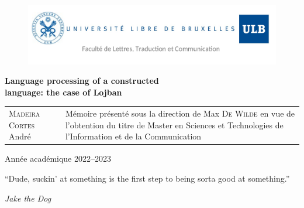 

\usepackage[
    backend=bibtex, style=authortitle, defernumbers=true,
]{biblatex}





\begin{titlingpage}

\begin{figure}[H]
\vspace{-2cm}
\hspace{-2.5cm}
\includegraphics[scale=0.30]{images/header.png}
\end{figure}

\vfill

\begin{center}
\hspace{-0.5cm}
\Huge{\textbf{Language processing of a constructed \\language: the case of Lojban}}\\
\end{center}

\vfill

\begin{tabular}{b{6.5cm}b{7.5cm}}
\textsc{Madeira Cortes} André & Mémoire présenté sous la direction de Max \textsc{De Wilde}
en vue de l'obtention du titre de Master en Sciences et Technologies de l'Information et de la Communication\\
\end{tabular}

\vfill

\begin{center}
\Large Année académique 2022--2023
\end{center}

\end{titlingpage}

\pagestyle{empty}

\renewcommand{\epigraphsize}{\large}
\renewcommand{\epigraphwidth}{7cm}
\epigraph{“Dude, suckin’ at something is the first step to being sorta good at something.”}{\textit{Jake the Dog}}

